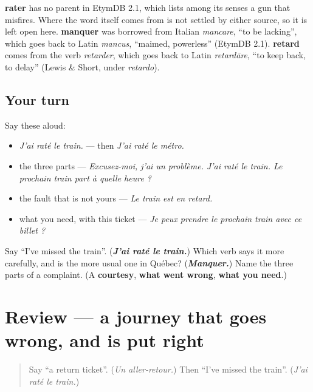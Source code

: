 \begin{cousinweb}
\textbf{rater} has no parent in EtymDB 2.1, which lists among its senses a gun that misfires. Where the word itself comes from is not settled by either source, so it is left open here. \textbf{manquer} was borrowed from Italian \emph{mancare}, \textquotedblleft{}to be lacking\textquotedblright{}, which goes back to Latin \emph{mancus}, \textquotedblleft{}maimed, powerless\textquotedblright{} (EtymDB 2.1). \textbf{retard} comes from the verb \emph{retarder}, which goes back to Latin \emph{retardāre}, \textquotedblleft{}to keep back, to delay\textquotedblright{} (Lewis \& Short, under \emph{retardo}).
\end{cousinweb}

\subsection*{Your turn}
Say these aloud:

\begin{itemize}
\raggedright
  \item \emph{J'ai raté le train.} — then \emph{J'ai raté le métro.}
  \item the three parts — \emph{Excusez-moi, j'ai un problème. J'ai raté le train. Le prochain train part à quelle heure ?}
  \item the fault that is not yours — \emph{Le train est en retard.}
  \item what you need, with this ticket — \emph{Je peux prendre le prochain train avec ce billet ?}
\end{itemize}

\begin{tcolorbox}[breakable,colback=teal!4,colframe=teal!35!black,title={Before you move on}]
Say \textquotedblleft{}I've missed the train\textquotedblright{}. (\emph{\textbf{J'ai raté le train.}}) Which verb says it more carefully, and is the more usual one in Québec? (\emph{\textbf{Manquer.}}) Name the three parts of a complaint. (A \textbf{courtesy}, \textbf{what went wrong}, \textbf{what you need}.)
\end{tcolorbox}
\section[(review)]{Review — a journey that goes wrong, and is put right}

\label{lesson:FR-C263-revision-voyage}



\begin{quote}
Say \textquotedblleft{}a return ticket\textquotedblright{}. (\emph{Un aller-retour.}) Then \textquotedblleft{}I've missed the train\textquotedblright{}. (\emph{J'ai raté le train.})
\end{quote}

